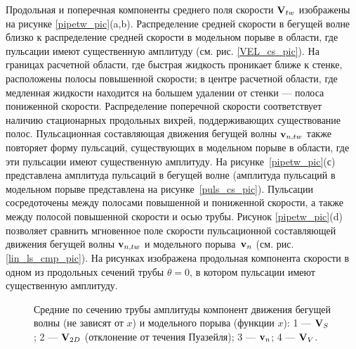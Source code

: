 Продольная и поперечная компоненты среднего поля скорости $\mathbf{V}_{tw}$ изображены на рисунке \ref{pipetw_pic}(a,b). Распределение средней скорости в бегущей волне близко к распределение средней скорости в модельном порыве в области, где пульсации имеют существенную амплитуду (см. рис. \ref{VEL_cs_pic}). На границах расчетной области, где быстрая жидкость проникает ближе к стенке, расположены полосы повышенной скорости; в центре расчетной области, где медленная жидкости находится на большем удалении от стенки --- полоса пониженной скорости. Распределение поперечной скорости соответствует наличию стационарных продольных вихрей, поддерживающих существование полос. Пульсационная составляющая движения бегущей волны $\mathbf{v}_{n,tw}$ также повторяет форму пульсаций, существующих в модельном порыве в области, где эти пульсации имеют существенную амплитуду. На рисунке~\ref{pipetw_pic}(с) представлена амплитуда пульсаций в бегущей волне (амплитуда пульсаций в модельном порыве представлена на рисунке~\ref{puls_cs_pic}). Пульсации сосредоточены между полосами повышенной и пониженной скорости, а также между полосой повышенной скорости и осью трубы. Рисунок \ref{pipetw_pic}(d) позволяет сравнить мгновенное поле скорости пульсационной составляющей движения бегущей волны $\mathbf{v}_{n,tw}$ и модельного порыва~$\mathbf{v}_n$ (см. рис. \ref{lin_ls_cmp_pic}). На рисунках изображена продольная компонента скорости в одном из продольных сечений трубы $\theta = 0$, в котором пульсации имеют существенную амплитуду. 

\begin{figure}
\caption{Средние по сечению трубы амплитуды компонент движения бегущей волны (не зависят от $x$) и модельного порыва (функции $x$): 1 --- $\mathbf{V}_S$; 2 --- $\mathbf{V}_{2D}$ (отклонение от течения Пуазейля); 3 --- $\mathbf{v}_n$; 4 --- $\mathbf{V}_V$.}
\label{pipetw_amp_pic}
\end{figure}

